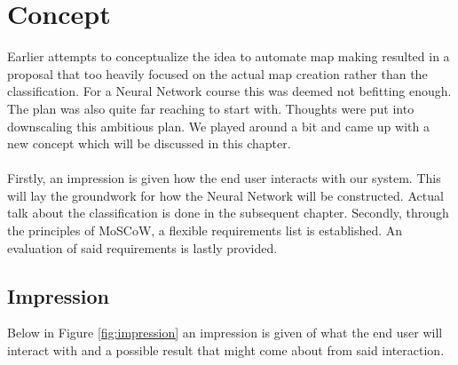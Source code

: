 \documentclass[a4paper,onecolumn]{report}
\begin{document}
\chapter{Concept}
\label{chap:concept}
Earlier attempts to conceptualize the idea to automate map making resulted in a proposal that too heavily focused on the actual map creation rather than the classification. For a Neural Network course this was deemed not befitting enough. The plan was also quite far reaching to start with. Thoughts were put into downscaling this ambitious plan. We played around a bit and came up with a new concept which will be discussed in this chapter.\\
\\
Firstly, an impression is given how the end user interacts with our system. This will lay the groundwork for how the Neural Network will be constructed. Actual talk about the classification is done in the subsequent chapter. Secondly, through the principles of MoSCoW, a flexible requirements list is established. An evaluation of said requirements is lastly provided. 

\section{Impression}

Below in Figure \ref{fig:impression} an impression is given of what the end user will interact with and a possible result that might come about from said interaction.\\
\end{document}
